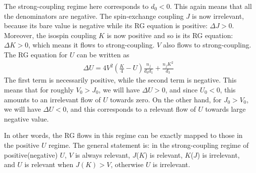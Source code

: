 \documentclass{report}
\numberwithin{equation}{section}
\begin{document}
The strong-coupling regime here corresponds to \(d_0 < 0\). This again means that all the denominators are negative. The spin-exchange coupling \(J\) is now irrelevant, because its bare value is negative while its RG equation is positive: \(\Delta J>0\). Moreover, the isospin coupling \(K\) is now positive and so is its RG equation: \(\Delta K>0\), which means it flows to strong-coupling. \(V\) also flows to strong-coupling. The RG equation for \(U\) can be written as
\begin{equation}\begin{aligned}
	\Delta U = 4V^2\left(\frac{K}{4} - U\right)\frac{n_j}{d_0 d_1} + \frac{n_j K^2}{d_3}
\end{aligned}\end{equation}
The first term is necessarily positive, while the second term is negative. This means that for roughly \(V_0 > J_0\), we  will have \(\Delta U > 0\), and since \(U_0 < 0\), this amounts to an irrelevant flow of \(U\) towards zero. On the other hand, for \(J_0 > V_0\), we will have \(\Delta U < 0\), and this corresponds to a relevant flow of \(U\) towards large negative value.

In other words, the RG flows in this regime can be exactly mapped to those in the positive \(U\) regime. The general statement is: in the strong-coupling regime of positive(negative) \(U\), \(V\) is always relevant, \(J\)(\(K\)) is relevant, \(K\)(\(J\)) is irrelevant, and \(U\) is relevant when \(J(K) > V\), otherwise \(U\) is irrelevant.
\end{document}

